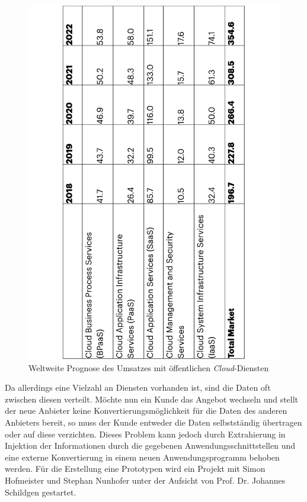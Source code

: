 \begin{figure}[h]
	\centering
	\includegraphics[angle=-90, width=1\textwidth]{Bilder/einleitung/Gartner1}
	\caption{Weltweite Prognose des Umsatzes mit öffentlichen \textit{Cloud}-Diensten \cite{Gartner2019}}
	\label{fig:GartnerSaaS2}
\end{figure}

Da allerdings eine Vielzahl an Diensten vorhanden ist, sind die Daten oft zwischen diesen verteilt. Möchte nun ein Kunde das Angebot wechseln und stellt der neue Anbieter keine Konvertierungsmöglichkeit für die Daten des anderen Anbieters bereit, so muss der Kunde entweder die Daten selbstständig übertragen oder auf diese verzichten. Dieses Problem kann jedoch durch Extrahierung in Injektion der Informationen durch die gegebenen Anwendungsschnittstellen und eine externe Konvertierung in einem neuen Anwendungsprogramm behoben werden. Für die Erstellung eine Prototypen wird ein Projekt mit Simon Hofmeister und Stephan Nunhofer unter der Aufsicht von Prof. Dr. Johannes Schildgen gestartet.